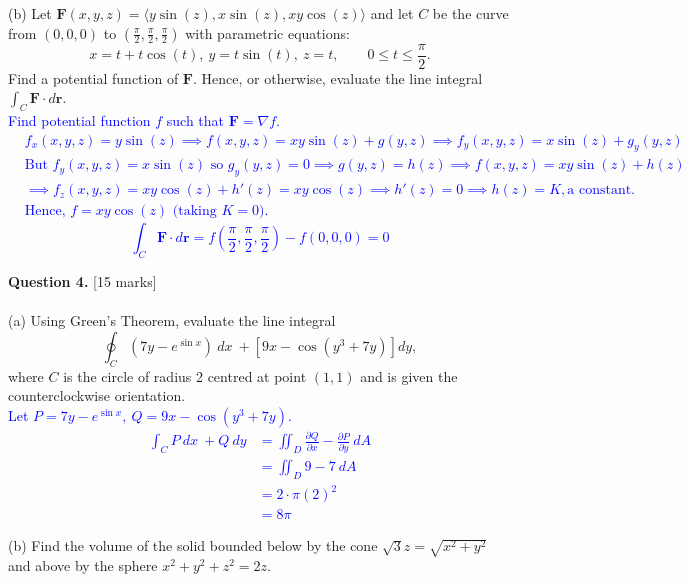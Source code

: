 \documentclass[12pt]{article}
\begin{document}
(b) Let $\mathbf{F}(x,y,z)=\langle y\sin(z),x\sin(z),xy\cos(z)\rangle$ and let $C$ be the curve from $(0,0,0)$ to $(\frac{\pi}{2},\frac{\pi}{2},\frac{\pi}{2})$ with parametric equations:
\[
x=t+t\cos(t),\ y=t\sin(t),\ z=t,\qquad 0\leq t\leq\frac{\pi}{2}.
\]
\indent\indent Find a potential function of $\mathbf{F}$. Hence, or otherwise, evaluate the line integral $\int_C\mathbf{F}\cdot d\mathbf{r}$.\\

\textcolor{blue}{
Find potential function $f$ such that $\mathbf{F}=\nabla f$. \begin{align*}
	&f_x(x,y,z)=y\sin(z) \implies f(x,y,z)=xy\sin(z)+g(y,z)\implies f_y(x,y,z)=x\sin(z)+g_y(y,z)\\
	&\text{But }f_y(x,y,z)=x\sin(z)\text{ so } g_y(y,z)=0\implies g(y,z)=h(z)\implies f(x,y,z)=xy\sin(z)+h(z)\\
	&\implies f_z(x,y,z)=xy\cos(z)+h'(z)=xy\cos(z)\implies h'(z)=0\implies h(z)=K,\text{a constant.}\\
	&\text{Hence, }f=xy\cos(z)\text{ (taking }K=0).
\end{align*}
\[
\int_C\mathbf{F}\cdot d\mathbf{r}=f(\frac{\pi}{2},\frac{\pi}{2},\frac{\pi}{2})-f(0,0,0)=0
\]
}

{\bf Question 4.} [15 marks]\\
\\\indent
(a) Using Green's Theorem, evaluate the line integral
\[
\oint_C(7y-e^{\sin x})\ dx\ +[9x-\cos(y^3+7y)]dy,
\]
\indent\indent where $C$ is the circle of radius 2 centred at point $(1,1)$ and is given the counterclockwise orientation.\\

\textcolor{blue}{
Let $P=7y-e^{\sin x},\ Q=9x-\cos(y^3+7y)$.
\begin{align*}
	\int_CP\ dx\ +Q\ dy&=\iint_D\frac{\partial Q}{\partial x}-\frac{\partial P}{\partial y}\ dA\\
	&=\iint_D 9-7\ dA\\
	&=2\cdot \pi(2)^2\\
	&=8\pi
\end{align*}
}

(b) Find the volume of the solid bounded below by the cone $\sqrt{3}z=\sqrt{x^2+y^2}$ and above by the sphere $x^2+y^2+z^2=2z$.\\
\end{document}

